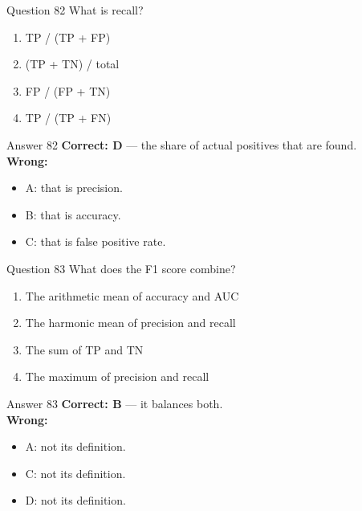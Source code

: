 \documentclass[aspectratio=169,11pt]{beamer}
\begin{document}
\begin{frame}{Question 82}
What is recall?
\begin{enumerate}[label=\Alph*.]
\item TP / (TP + FP)
\item (TP + TN) / total
\item FP / (FP + TN)
\item TP / (TP + FN)
\end{enumerate}
\end{frame}
\begin{frame}{Answer 82}
\textbf{Correct: D} --- the share of actual positives that are found.\\
\vspace{0.5em}
\textbf{Wrong:}
\begin{itemize}
\item A: that is precision.
\item B: that is accuracy.
\item C: that is false positive rate.
\end{itemize}
\end{frame}

\begin{frame}{Question 83}
What does the F1 score combine?
\begin{enumerate}[label=\Alph*.]
\item The arithmetic mean of accuracy and AUC
\item The harmonic mean of precision and recall
\item The sum of TP and TN
\item The maximum of precision and recall
\end{enumerate}
\end{frame}
\begin{frame}{Answer 83}
\textbf{Correct: B} --- it balances both.\\
\vspace{0.5em}
\textbf{Wrong:}
\begin{itemize}
\item A: not its definition.
\item C: not its definition.
\item D: not its definition.
\end{itemize}
\end{frame}
\end{document}
